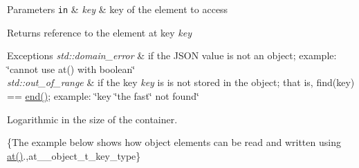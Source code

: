 \begin{DoxyParams}[1]{Parameters}
\mbox{\tt in}  & {\em key} & key of the element to access\\
\hline
\end{DoxyParams}
\begin{DoxyReturn}{Returns}
reference to the element at key {\itshape key} 
\end{DoxyReturn}

\begin{DoxyExceptions}{Exceptions}
{\em std\-::domain\-\_\-error} & if the J\-S\-O\-N value is not an object; example\-: {\ttfamily \char`\"{}cannot use at() with boolean\char`\"{}} \\
\hline
{\em std\-::out\-\_\-of\-\_\-range} & if the key {\itshape key} is is not stored in the object; that is, {\ttfamily find(key) == \hyperlink{classnlohmann_1_1basic__json_a12ccf14d39ddae52f6c7e126105a230b}{end()}}; example\-: {\ttfamily \char`\"{}key \char`\"{}the fast\char`\"{} not found\char`\"{}}\\
\hline
\end{DoxyExceptions}
Logarithmic in the size of the container.

\{The example below shows how object elements can be read and written using {\ttfamily \hyperlink{classnlohmann_1_1basic__json_a214a8c22d616fd3567b88932c07436c9}{at()}}.,at\-\_\-\-\_\-object\-\_\-t\-\_\-key\-\_\-type\}

